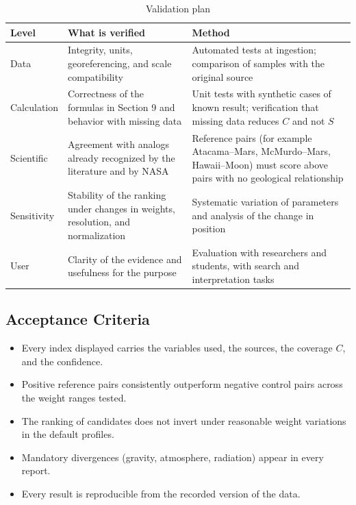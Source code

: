 \documentclass[12pt,letterpaper]{article}
\begin{document}
\begin{table}[htbp]
\centering
\caption{Validation plan}
\small
\begin{tabularx}{\textwidth}{>{\raggedright\arraybackslash}p{2.2cm} >{\raggedright\arraybackslash}X >{\raggedright\arraybackslash}X}
\toprule
\textbf{Level} & \textbf{What is verified} & \textbf{Method} \\
\midrule
Data & Integrity, units, georeferencing, and scale compatibility & Automated tests at ingestion; comparison of samples with the original source \\
Calculation & Correctness of the formulas in Section 9 and behavior with missing data & Unit tests with synthetic cases of known result; verification that missing data reduces $C$ and not $S$ \\
Scientific & Agreement with analogs already recognized by the literature and by NASA & Reference pairs (for example Atacama--Mars, McMurdo--Mars, Hawaii--Moon) must score above pairs with no geological relationship \\
Sensitivity & Stability of the ranking under changes in weights, resolution, and normalization & Systematic variation of parameters and analysis of the change in position \\
User & Clarity of the evidence and usefulness for the purpose & Evaluation with researchers and students, with search and interpretation tasks \\
\bottomrule
\end{tabularx}
\end{table}

\subsection{Acceptance Criteria}

\begin{itemize}
  \item Every index displayed carries the variables used, the sources, the coverage $C$, and the confidence.
  \item Positive reference pairs consistently outperform negative control pairs across the weight ranges tested.
  \item The ranking of candidates does not invert under reasonable weight variations in the default profiles.
  \item Mandatory divergences (gravity, atmosphere, radiation) appear in every report.
  \item Every result is reproducible from the recorded version of the data.
\end{itemize}
\end{document}
